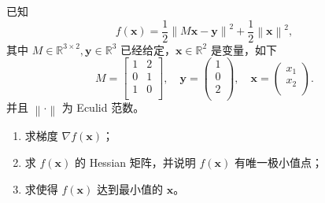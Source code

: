 \documentclass[11pt,a4paper]{exam-zh}
\newcommand{\bvec}[1]{\boldsymbol{#1}}
\newcommand{\R}{\mathbb{R}}
\begin{document}
\begin{problem}
  已知 $$f \left(\bvec{x}\right) = \frac{1}{2} \left\|M \bvec{x} - \bvec{y}\right\|^2 + \frac{1}{2} \left\|\bvec{x}\right\|^2,$$
  其中 $M \in \R^{3 \times 2}, \bvec{y} \in \R^3$ 已经给定，$\bvec{x} \in \R^2$ 是变量，如下 $$
    M = \begin{bmatrix}
      1 & 2 \\
      0 & 1 \\
      1 & 0 \\
    \end{bmatrix}, \quad \bvec{y} = \begin{pmatrix}
      1 \\
      0 \\
      2 \\
    \end{pmatrix}, \quad \bvec{x} = \begin{pmatrix}
      x_1 \\
      x_2 \\
    \end{pmatrix}.
  $$
  并且 $\left\| \cdot \right\|$ 为 Eculid 范数。
  \begin{enumerate}
    \item 求梯度 $\nabla f \left(\bvec{x}\right)$；
    \item 求 $f \left(\bvec{x}\right)$ 的 Hessian 矩阵，并说明 $f \left(\bvec{x}\right)$ 有唯一极小值点；
    \item 求使得 $f \left(\bvec{x}\right)$ 达到最小值的 $\bvec{x}$。
  \end{enumerate}
\end{problem}
\end{document}
